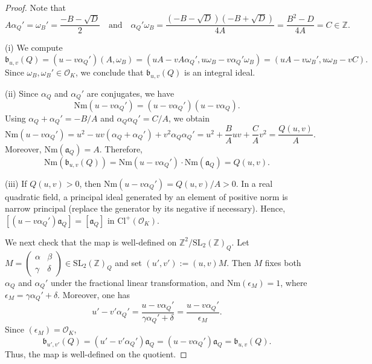 \documentclass[12pt]{amsart}
\numberwithin{equation}{section}
\theoremstyle{definition}
\begin{document}
\begin{proof}
Note that
$$A\alpha_{Q}'=\omega_{B}'=\frac{-B-\sqrt{D}}{2}\quad\text{and}\quad\alpha_{Q}'\omega_{B}=\frac{(-B-\sqrt{D})(-B+\sqrt{D})}{4A}=\frac{B^{2}-D}{4A}=C\in\mathbb{Z}.$$

(i) We compute
$$\mathfrak{b}_{u,v}(Q)=(u-v\alpha_{Q}')(A,\omega_{B})=(uA-vA\alpha_{Q}',u\omega_{B}-v\alpha_{Q}'\omega_{B})=(uA-v\omega_{B}',u\omega_{B}-vC).$$
Since $\omega_{B},\omega_{B}'\in\mathcal{O}_{K}$, we conclude that $\mathfrak{b}_{u,v}(Q)$ is an integral ideal.

(ii) Since $\alpha_Q$ and $\alpha_Q'$ are conjugates, we have
$$\mathrm{Nm}(u-v\alpha_{Q}')=(u-v\alpha_{Q}')(u-v\alpha_{Q}).$$
Using $\alpha_{Q}+\alpha_{Q}'=-B/A$ and $\alpha_{Q}\alpha_{Q}'=C/A$, we obtain
$$\mathrm{Nm}(u-v\alpha_{Q}')=u^{2}-uv(\alpha_{Q}+\alpha_{Q}')+v^{2}\alpha_{Q}\alpha_{Q}'=u^{2}+\frac{B}{A}uv+\frac{C}{A}v^{2}=\frac{Q(u,v)}{A}.$$
Moreover, $\mathrm{Nm}(\mathfrak{a}_{Q})=A$. Therefore,
$$\mathrm{Nm}(\mathfrak{b}_{u,v}(Q))=\mathrm{Nm}(u-v\alpha_{Q}')\cdot\mathrm{Nm}(\mathfrak{a}_{Q})=Q(u,v).$$

(iii) If $Q(u,v)>0$, then $\mathrm{Nm}(u-v\alpha_Q')=Q(u,v)/A>0$.
In a real quadratic field, a principal ideal generated by an element of positive norm is narrow principal (replace the generator by its negative if necessary).
Hence, $[(u-v\alpha_{Q}')\mathfrak{a}_{Q}]=[\mathfrak{a}_{Q}]$ in $\mathrm{Cl}^{+}(\mathcal{O}_{K})$.

We next check that the map is well-defined on $\mathbb{Z}^{2}/\mathrm{SL}_{2}(\mathbb{Z})_{Q}$.
Let $M=\left(\begin{smallmatrix} \alpha & \beta \\ \gamma & \delta\end{smallmatrix}\right)\in\mathrm{SL}_{2}(\mathbb{Z})_{Q}$ and set $(u',v'):=(u,v)M$.
Then $M$ fixes both $\alpha_{Q}$ and $\alpha_{Q}'$ under the fractional linear transformation, and $\mathrm{Nm}(\epsilon_{M})=1$, where $\epsilon_{M}=\gamma\alpha_{Q}'+\delta$.
Moreover, one has
$$u'-v'\alpha_{Q}'=\frac{u-v\alpha_{Q}'}{\gamma\alpha_{Q}'+\delta}=\frac{u-v\alpha_{Q}'}{\epsilon_{M}}.$$
Since $(\epsilon_{M})=\mathcal{O}_{K}$,
$$\mathfrak{b}_{u',v'}(Q)=(u'-v'\alpha_{Q}')\mathfrak{a}_{Q}=(u-v\alpha_{Q}')\mathfrak{a}_{Q}=\mathfrak{b}_{u,v}(Q).$$
Thus, the map is well-defined on the quotient.


\end{proof}
\end{document}
